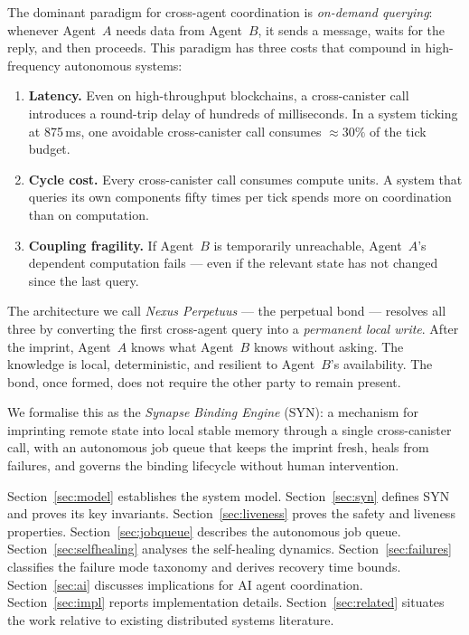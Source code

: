\documentclass[12pt]{article}
\begin{document}
The dominant paradigm for cross-agent coordination is \emph{on-demand querying}:
whenever Agent~$A$ needs data from Agent~$B$, it sends a message, waits for
the reply, and then proceeds.  This paradigm has three costs that compound in
high-frequency autonomous systems:

\begin{enumerate}[label=(\arabic*)]
  \item \textbf{Latency.}  Even on high-throughput blockchains, a cross-canister
    call introduces a round-trip delay of hundreds of milliseconds.  In a system
    ticking at 875\,ms, one avoidable cross-canister call consumes
    $\approx\!30\%$ of the tick budget.
  \item \textbf{Cycle cost.}  Every cross-canister call consumes compute units.
    A system that queries its own components fifty times per tick spends more
    on coordination than on computation.
  \item \textbf{Coupling fragility.}  If Agent~$B$ is temporarily unreachable,
    Agent~$A$'s dependent computation fails — even if the relevant state has
    not changed since the last query.
\end{enumerate}

The architecture we call \emph{Nexus Perpetuus} — the perpetual bond — resolves
all three by converting the first cross-agent query into a \emph{permanent local
write}.  After the imprint, Agent~$A$ knows what Agent~$B$ knows without asking.
The knowledge is local, deterministic, and resilient to Agent~$B$'s availability.
The bond, once formed, does not require the other party to remain present.

We formalise this as the \emph{Synapse Binding Engine} (SYN): a mechanism for
imprinting remote state into local stable memory through a single cross-canister
call, with an autonomous job queue that keeps the imprint fresh, heals from
failures, and governs the binding lifecycle without human intervention.

Section~\ref{sec:model} establishes the system model.
Section~\ref{sec:syn} defines SYN and proves its key invariants.
Section~\ref{sec:liveness} proves the safety and liveness properties.
Section~\ref{sec:jobqueue} describes the autonomous job queue.
Section~\ref{sec:selfhealing} analyses the self-healing dynamics.
Section~\ref{sec:failures} classifies the failure mode taxonomy and derives
recovery time bounds.
Section~\ref{sec:ai} discusses implications for AI agent coordination.
Section~\ref{sec:impl} reports implementation details.
Section~\ref{sec:related} situates the work relative to existing distributed
systems literature.
\end{document}
